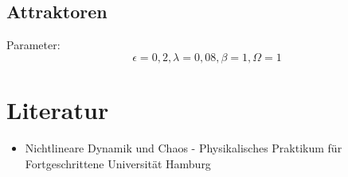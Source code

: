 \documentclass{scrartcl}
\begin{document}
\subsection { Attraktoren }
Parameter:
$$\epsilon = 0,2, \lambda = 0,08, \beta = 1, \Omega = 1$$


\section{ Literatur }
\begin{itemize} 
\item Nichtlineare Dynamik und Chaos - Physikalisches Praktikum für Fortgeschrittene Universität Hamburg
\end{itemize}
\end{document}
